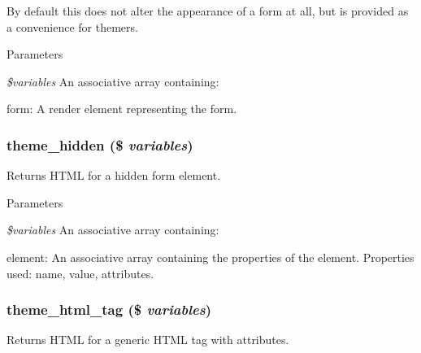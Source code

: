By default this does not alter the appearance of a form at all, but is provided as a convenience for themers.


\begin{DoxyParams}{Parameters}
\item[{\em \$variables}]An associative array containing:
\begin{DoxyItemize}
\item form: A render element representing the form. 
\end{DoxyItemize}\end{DoxyParams}
\hypertarget{group__themeable_gaa3463af7c6de7aaa4f5c904a8d23fbaf}{
\subsubsection[{theme\_\-hidden}]{\setlength{\rightskip}{0pt plus 5cm}theme\_\-hidden (\$ {\em variables})}}
\label{group__themeable_gaa3463af7c6de7aaa4f5c904a8d23fbaf}
Returns HTML for a hidden form element.


\begin{DoxyParams}{Parameters}
\item[{\em \$variables}]An associative array containing:
\begin{DoxyItemize}
\item element: An associative array containing the properties of the element. Properties used: name, value, attributes. 
\end{DoxyItemize}\end{DoxyParams}
\hypertarget{group__themeable_ga553aba4a879c7a0b01a85486ca0cea33}{
\subsubsection[{theme\_\-html\_\-tag}]{\setlength{\rightskip}{0pt plus 5cm}theme\_\-html\_\-tag (\$ {\em variables})}}
\label{group__themeable_ga553aba4a879c7a0b01a85486ca0cea33}
Returns HTML for a generic HTML tag with attributes.


